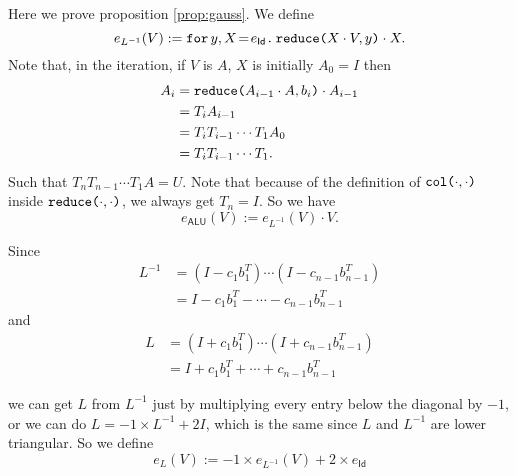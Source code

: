 Here we prove proposition \ref{prop:gauss}. We define
$$
e_{L^{-1}}(V) :=  \initf{e_{\mathsf{Id}}}{y}{X}{\red{X\cdot V}{y}\cdot X}.
$$
Note that, in the iteration, if $V$ is $A$, $X$ is initially $A_0=I$ then
\begin{align*}
  A_i&=\red{A_{i-1}\cdot A}{b_i}\cdot A_{i-1} \\
  &=T_iA_{i-1} \\
  &=T_iT_{i-1}\cdots T_1A_0 \\
  &=T_iT_{i-1}\cdots T_1.
\end{align*}
Such that $T_nT_{n-1}\cdots T_1A=U$. Note that because of the definition of $\ccol{\cdot}{\cdot}$ inside $\red{\cdot}{\cdot}$, we always get $T_n=I$.
So we have
$$
e_{\mathsf{ALU}}(V) :=  e_{L^{-1}}(V) \cdot V.
$$ 

Since
\begin{align*}
  L^{-1}&=(I-c_1b_1^T)\cdots (I-c_{n-1}b_{n-1}^T) \\
  &=I-c_1b_1^T-\cdots - c_{n-1}b_{n-1}^T
\end{align*}
and
\begin{align*}
  L&=(I+c_1b_1^T)\cdots (I+c_{n-1}b_{n-1}^T) \\
  &=I+c_1b_1^T+\cdots + c_{n-1}b_{n-1}^T
\end{align*}

we can get $L$ from $L^{-1}$ just by multiplying every entry below the diagonal by $-1$, or we can do $L=-1\times L^{-1} + 2I$, which is the same since $L$ and $L^{-1}$ are lower triangular. So we define
$$
e_{L}(V) :=  -1\times e_{L^{-1}}(V) + 2\times e_{\mathsf{Id}}
$$